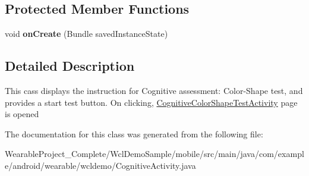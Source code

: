\subsection*{Protected Member Functions}
\begin{DoxyCompactItemize}
\item 
void {\bfseries on\+Create} (Bundle saved\+Instance\+State)\hypertarget{classcom_1_1example_1_1android_1_1wearable_1_1wcldemo_1_1CognitiveActivity_aea3968470195eb24274d1db90be34dbd}{}\label{classcom_1_1example_1_1android_1_1wearable_1_1wcldemo_1_1CognitiveActivity_aea3968470195eb24274d1db90be34dbd}

\end{DoxyCompactItemize}


\subsection{Detailed Description}
This cass displays the instruction for Cognitive assessment\+: Color-\/\+Shape test, and provides a start test button. On clicking, \hyperlink{classcom_1_1example_1_1android_1_1wearable_1_1wcldemo_1_1CognitiveColorShapeTestActivity}{Cognitive\+Color\+Shape\+Test\+Activity} page is opened 

The documentation for this class was generated from the following file\+:\begin{DoxyCompactItemize}
\item 
Wearable\+Project\+\_\+\+Complete/\+Wcl\+Demo\+Sample/mobile/src/main/java/com/example/android/wearable/wcldemo/Cognitive\+Activity.\+java\end{DoxyCompactItemize}
